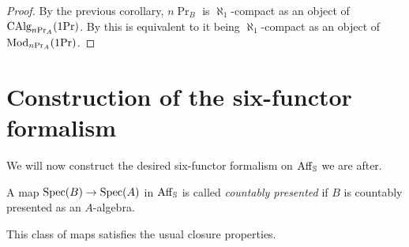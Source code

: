 \documentclass[11pt]{book}
\begin{document}
	\begin{proof}
		By the previous corollary, $n\Pr_B$ is $\aleph_1$-compact as an object of ${\textup{CAlg}}_{n\textup{Pr}_A}(1\textup{Pr})$. By  this is equivalent to it being $\aleph_1$-compact as an object of ${\textup{Mod}}_{n\textup{Pr}_A}(1\textup{Pr})$.
	\end{proof}

	\section{Construction of the six-functor formalism}

	We will now construct the desired six-functor formalism on $\operatorname{Aff}_{\operatorname{\mathbb S}}$ we are after.

	\begin{definition}
		A map $\operatorname{Spec}(B) \to \operatorname{Spec}(A)$ in $\operatorname{Aff}_{\operatorname{\mathbb S}}$ is called \emph{countably presented} if $B$ is countably presented as an $A$-algebra.
	\end{definition}

	This class of maps satisfies the usual closure properties.
\end{document}

